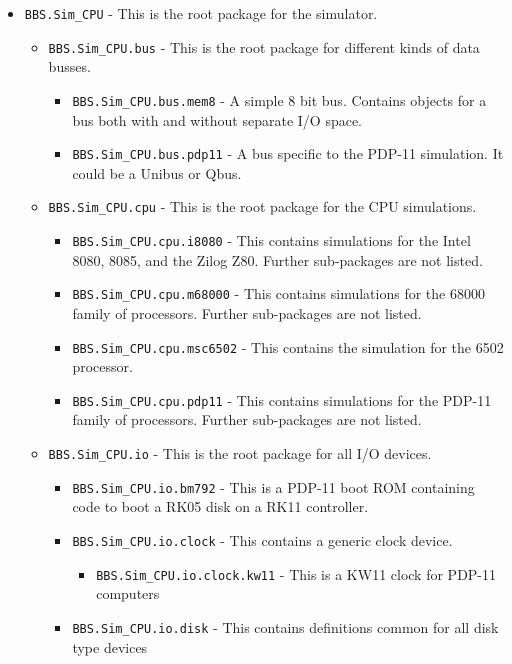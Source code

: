 \documentclass[10pt, openany]{book}
\newcommand{\package}[1]{\texttt{#1}}
\begin{document}
\begin{itemize}
  \item \package{BBS.Sim\_CPU} - This is the root package for the simulator.
  \begin{itemize}
    \item \package{BBS.Sim\_CPU.bus} - This is the root package for different kinds of data busses.
    \begin{itemize}
      \item \package{BBS.Sim\_CPU.bus.mem8} - A simple 8 bit bus.  Contains objects for a bus both with and without separate I/O space.
      \item \package{BBS.Sim\_CPU.bus.pdp11} - A bus specific to the PDP-11 simulation.  It could be a Unibus or Qbus.
    \end{itemize}
    \item \package{BBS.Sim\_CPU.cpu} - This is the root package for the CPU simulations.
    \begin{itemize}
      \item \package{BBS.Sim\_CPU.cpu.i8080} - This contains simulations for the Intel 8080, 8085, and the Zilog Z80.  Further sub-packages are not listed.
      \item \package{BBS.Sim\_CPU.cpu.m68000} - This contains simulations for the 68000 family of processors.  Further sub-packages are not listed.
      \item \package{BBS.Sim\_CPU.cpu.msc6502} - This contains the simulation for the 6502 processor.
      \item \package{BBS.Sim\_CPU.cpu.pdp11} - This contains simulations for the PDP-11 family of processors.  Further sub-packages are not listed.
    \end{itemize}
    \item \package{BBS.Sim\_CPU.io} - This is the root package for all I/O devices.
    \begin{itemize}
      \item \package{BBS.Sim\_CPU.io.bm792} - This is a PDP-11 boot ROM containing code to boot a RK05 disk on a RK11 controller.
      \item \package{BBS.Sim\_CPU.io.clock} - This contains a generic clock device.
      \begin{itemize}
        \item \package{BBS.Sim\_CPU.io.clock.kw11} - This is a KW11 clock for PDP-11 computers
      \end{itemize}
      \item \package{BBS.Sim\_CPU.io.disk} - This contains definitions common for all disk type devices

\end{itemize}
\end{itemize}
\end{itemize}
\end{document}
